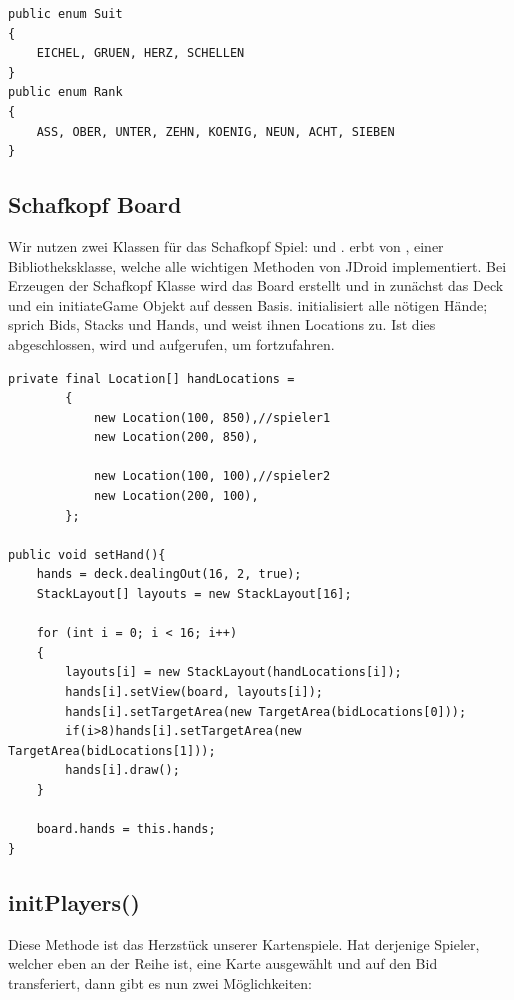 \begin{lstlisting}[caption={Enums für Kartenwertigkeiten},captionpos=b]
public enum Suit
{
    EICHEL, GRUEN, HERZ, SCHELLEN
}
public enum Rank
{
    ASS, OBER, UNTER, ZEHN, KOENIG, NEUN, ACHT, SIEBEN
}
\end{lstlisting}

\subsection{Schafkopf Board}

Wir nutzen zwei Klassen für das Schafkopf Spiel:  und
.  erbt von , einer
Bibliotheksklasse, welche alle wichtigen Methoden von JDroid implementiert. Bei
Erzeugen der Schafkopf Klasse wird das Board erstellt und in 
zunächst das Deck und ein initiateGame Objekt auf dessen Basis.
 initialisiert alle nötigen Hände; sprich Bids, Stacks und
Hands, und weist ihnen Locations zu. Ist dies abgeschlossen, wird
 und  aufgerufen, um fortzufahren.

\begin{lstlisting}[caption={Beispiel Hands initialisieren},captionpos=b]
private final Location[] handLocations =
        {
            new Location(100, 850),//spieler1
            new Location(200, 850),

            new Location(100, 100),//spieler2
            new Location(200, 100),
        };

public void setHand(){
    hands = deck.dealingOut(16, 2, true);
    StackLayout[] layouts = new StackLayout[16];

    for (int i = 0; i < 16; i++)
    {
        layouts[i] = new StackLayout(handLocations[i]);
        hands[i].setView(board, layouts[i]);
        hands[i].setTargetArea(new TargetArea(bidLocations[0]));
        if(i>8)hands[i].setTargetArea(new TargetArea(bidLocations[1]));
        hands[i].draw();
    }

    board.hands = this.hands;
}

\end{lstlisting}

\subsection{initPlayers()}

Diese Methode ist das Herzstück unserer Kartenspiele. Hat derjenige Spieler,
welcher eben an der Reihe ist, eine Karte ausgewählt und auf den Bid
transferiert, dann gibt es nun zwei Möglichkeiten:

